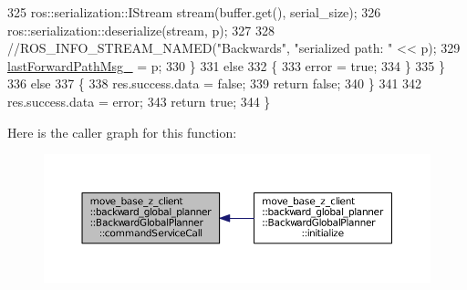 \begin{DoxyCode}
325             ros::serialization::IStream stream(buffer.get(), serial\_size);
326             ros::serialization::deserialize(stream, p);
327 
328             \textcolor{comment}{//ROS\_INFO\_STREAM\_NAMED("Backwards", "serialized path: " << p);}
329             \hyperlink{classmove__base__z__client_1_1backward__global__planner_1_1BackwardGlobalPlanner_a058da13b9ee6b1d878830503e67de638}{lastForwardPathMsg\_} = p;
330         \}
331         \textcolor{keywordflow}{else}
332         \{
333             error = \textcolor{keyword}{true};
334         \}
335     \}
336     \textcolor{keywordflow}{else}
337     \{
338         res.success.data = \textcolor{keyword}{false};
339         \textcolor{keywordflow}{return} \textcolor{keyword}{false};
340     \}
341 
342     res.success.data = error;
343     \textcolor{keywordflow}{return} \textcolor{keyword}{true};
344 \}
\end{DoxyCode}


Here is the caller graph for this function\+:
\nopagebreak
\begin{figure}[H]
\begin{center}
\leavevmode
\includegraphics[width=350pt]{classmove__base__z__client_1_1backward__global__planner_1_1BackwardGlobalPlanner_ad6f5fb1f85f6869b06bd4cb0feada148_icgraph}
\end{center}
\end{figure}


